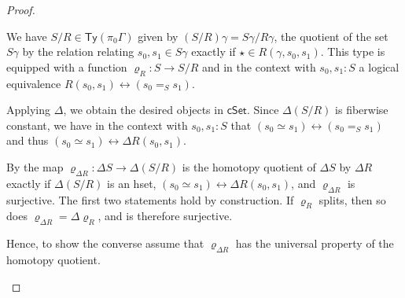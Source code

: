 \documentclass[10pt,a4paper]{article}
\newcommand{\cSet}{\mathsf{cSet}}
\newcommand\Ty{\mathsf{Ty}}
\begin{document}
\begin{proof}
  \begin{description}[font=\normalfont]
  \item[\ref{prop:set-quotient-is-homotopy-quotient-iff-surjection-splits:well-defined}] 
    We have \(S/R \in \Ty(\pi_0\Gamma)\) given by \((S/R)\gamma = S\gamma / R\gamma\), the quotient of the set \(S\gamma\) by the relation relating \(s_0, s_1 \in S\gamma\) exactly if \(\star \in R(\gamma, s_0, s_1)\).
    This type is equipped with a function \(\varrho_R \colon S \to S/R\) and in the context with \(s_0, s_1 \colon S\) a logical equivalence \(R(s_0, s_1) \leftrightarrow (s_0 =_S s_1)\).

    Applying \(\Delta\), we obtain the desired objects in \(\cSet\).
    Since \(\Delta(S/R)\) is fiberwise constant, we have in the context with \(s_0, s_1 \colon S\) that \((s_0 \simeq s_1) \leftrightarrow (s_0 =_S s_1)\) and thus \((s_0 \simeq s_1) \leftrightarrow \Delta R(s_0, s_1)\).
  
  \item[\ref{prop:set-quotient-is-homotopy-quotient-iff-surjection-splits:characterization}] %
    By \cite[Theorem 18.2.3]{rijke2025intro} the map \(\varrho_{\Delta R} \colon \Delta S \to \Delta(S/R)\) is the homotopy quotient of \(\Delta S\) by \(\Delta R\) exactly if \(\Delta(S/R)\) is an hset, \((s_0 \simeq s_1) \leftrightarrow \Delta R(s_0, s_1)\), and \(\varrho_{\Delta R}\) is surjective.
    The first two statements hold by construction.
    If \(\varrho_R\) splits, then so does \(\varrho_{\Delta R} = \Delta \varrho_{R}\), and is therefore surjective.

    Hence, to show the converse assume that \(\varrho_{\Delta R}\) has the universal property of the homotopy quotient.

  \end{description}
\end{proof}

\end{document}
